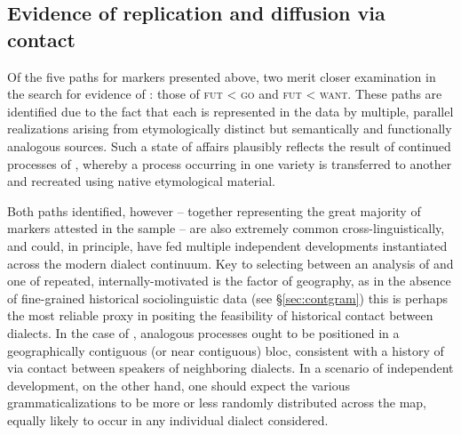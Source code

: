 \documentclass[output=paper]{langsci/langscibook}
\begin{document}
\subsection{ Evidence of replication and diffusion via contact}\label{sec:repl}


Of the five  paths for   markers presented above, two merit closer examination in the search for evidence of : those of \textsc{fut} < \textsc{go} and \textsc{fut} < \textsc{want}. These paths are identified due to the fact that each is represented in the data by multiple, parallel realizations arising from etymologically distinct but semantically and functionally analogous sources. Such a state of affairs plausibly reflects the result of continued processes of , whereby a  process occurring in one  variety is transferred to another and recreated using native etymological material.

Both paths identified, however – together representing the great majority of   markers attested in the sample – are also extremely common cross-linguistically, and could, in principle, have fed multiple independent developments instantiated across the modern  dialect continuum. Key to selecting between an analysis of  and one of repeated, internally-motivated  is the factor of geography, as in the absence of fine-grained historical sociolinguistic data (see §\ref{sec:contgram}) this is perhaps the most reliable proxy in positing the feasibility of historical contact between dialects. In the case of , analogous  processes ought to be positioned in a geographically contiguous (or near contiguous) bloc, consistent with a history of  via contact between speakers of neighboring dialects. In a scenario of independent development, on the other hand, one should expect the various grammaticalizations to be more or less randomly distributed across the map, equally likely to occur in any individual dialect considered.
\end{document}
